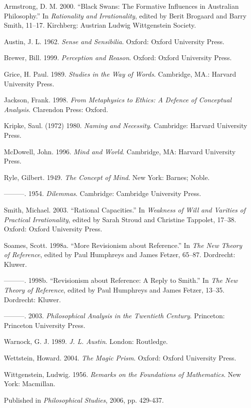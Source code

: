 \documentclass[
  11pt,
  letterpaper,
  DIV=11,
  numbers=noendperiod,
  twoside]{scrartcl}
\newlength{\cslhangindent}
\newenvironment{CSLReferences}[2] %
 {\begin{list}{}{%
  \setlength{\itemindent}{0pt}
  \setlength{\leftmargin}{0pt}
  \setlength{\parsep}{0pt}
  \ifodd #1
   \setlength{\leftmargin}{\cslhangindent}
   \setlength{\itemindent}{-1\cslhangindent}
  \fi
  \setlength{\itemsep}{#2\baselineskip}}}
 {\end{list}}
\begin{document}
\label{refs}
\begin{CSLReferences}{1}{0}
Armstrong, D. M. 2000. {``Black Swans: The Formative Influences in
Australian Philosophy.''} In \emph{Rationality and Irrationality},
edited by Berit Brogaard and Barry Smith, 11--17. Kirchberg: Austrian
Ludwig Wittgenstein Society.

Austin, J. L. 1962. \emph{Sense and Sensibilia}. Oxford: Oxford
University Press.

Brewer, Bill. 1999. \emph{Perception and Reason}. Oxford: Oxford
University Press.

Grice, H. Paul. 1989. \emph{Studies in the Way of Words}. Cambridge,
MA.: Harvard University Press.

Jackson, Frank. 1998. \emph{From Metaphysics to Ethics: A Defence of
Conceptual Analysis}. Clarendon Press: Oxford.

Kripke, Saul. (1972) 1980. \emph{Naming and Necessity}. Cambridge:
Harvard University Press.

McDowell, John. 1996. \emph{Mind and World}. Cambridge, MA: Harvard
University Press.

Ryle, Gilbert. 1949. \emph{The Concept of Mind}. New York: Barnes;
Noble.

---------. 1954. \emph{Dilemmas}. Cambridge: Cambridge University Press.

Smith, Michael. 2003. {``Rational Capacities.''} In \emph{Weakness of
Will and Varities of Practical Irrationality}, edited by Sarah Stroud
and Christine Tappolet, 17--38. Oxford: Oxford University Press.

Soames, Scott. 1998a. {``More Revisionism about Reference.''} In
\emph{The New Theory of Reference}, edited by Paul Humphreys and James
Fetzer, 65--87. Dordrecht: Kluwer.

---------. 1998b. {``Revisionism about Reference: A Reply to Smith.''}
In \emph{The New Theory of Reference}, edited by Paul Humphreys and
James Fetzer, 13--35. Dordrecht: Kluwer.

---------. 2003. \emph{Philosophical Analysis in the Twentieth Century}.
Princeton: Princeton University Press.

Warnock, G. J. 1989. \emph{J. L. Austin}. London: Routledge.

Wettstein, Howard. 2004. \emph{The Magic Prism}. Oxford: Oxford
University Press.

Wittgenstein, Ludwig. 1956. \emph{Remarks on the Foundations of
Mathematics}. New York: Macmillan.

\end{CSLReferences}



\noindent Published in\emph{
Philosophical Studies}, 2006, pp. 429-437.
\end{document}
